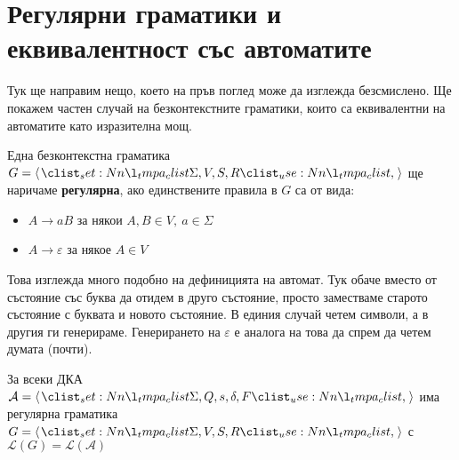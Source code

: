 \section{Регулярни граматики и еквивалентност със автоматите}

Тук ще направим нещо, което на пръв поглед може да изглежда безсмислено.
Ще покажем частен случай на безконтекстните граматики, които са еквивалентни на автоматите като изразителна мощ.

\begin{definition}
    Една безконтекстна граматика $G = \opair{\Sigma, V, S, R}$ ще наричаме \textbf{регулярна}, ако единствените правила в $G$ са от вида:
    \begin{itemize}
        \item $A \rightarrow aB$ за някои $A, B \in V, \: a \in \Sigma$
        \item $A \rightarrow \varepsilon$ за някое $A \in V$
    \end{itemize}
\end{definition}

Това изглежда много подобно на дефиницията на автомат.
Тук обаче вместо от състояние със буква да отидем в друго състояние, просто заместваме старото състояние с буквата и новото състояние.
В единия случай четем символи, а в другия ги генерираме.
Генерирането на $\varepsilon$ е аналога на това да спрем да четем думата (почти).

\begin{claim}
    За всеки ДКА $\mathcal{A} = \opair{\Sigma, Q, s, \delta, F}$ има регулярна граматика $G = \opair{\Sigma, V, S, R}$ с $\mathcal{L}(G) = \mathcal{L(A)}$
\end{claim}

